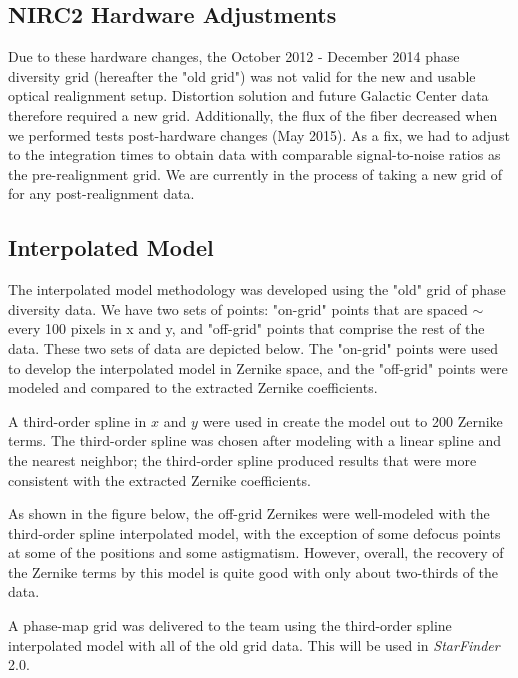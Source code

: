 \subsection{NIRC2 Hardware Adjustments}
Due to these hardware changes, the October 2012 - December 2014 phase diversity grid (hereafter the "old grid") was not valid for the new and usable optical realignment setup. Distortion solution and future Galactic Center data therefore required a new grid. Additionally, the flux of the fiber decreased when we performed tests post-hardware changes (May 2015). As a fix, we had to adjust to the integration times to obtain data with comparable signal-to-noise ratios as the pre-realignment grid. We are currently in the process of taking a new grid of for any post-realignment data.
\subsection{Interpolated Model}
The interpolated model methodology was developed using the "old" grid of phase diversity data. We have two sets of points: "on-grid" points that are spaced $\sim$every 100 pixels in x and y, and "off-grid" points that comprise the rest of the data. These two sets of data are depicted below. The "on-grid" points were used to develop the interpolated model in Zernike space, and the "off-grid" points were modeled and compared to the extracted Zernike coefficients.

A third-order spline in $x$ and $y$ were used in create the model out to 200 Zernike terms. The third-order spline was chosen after modeling with a linear spline and the nearest neighbor; the third-order spline produced results that were more consistent with the extracted Zernike coefficients. 

As shown in the figure below, the off-grid Zernikes were well-modeled with the third-order spline interpolated model, with the exception of some defocus points at some of the positions and some astigmatism. However, overall, the recovery of the Zernike terms by this model is quite good with only about two-thirds of the data. 

A phase-map grid was delivered to the team using the third-order spline interpolated model with all of the old grid data. This will be used in \textit{StarFinder} 2.0.
    
    
    